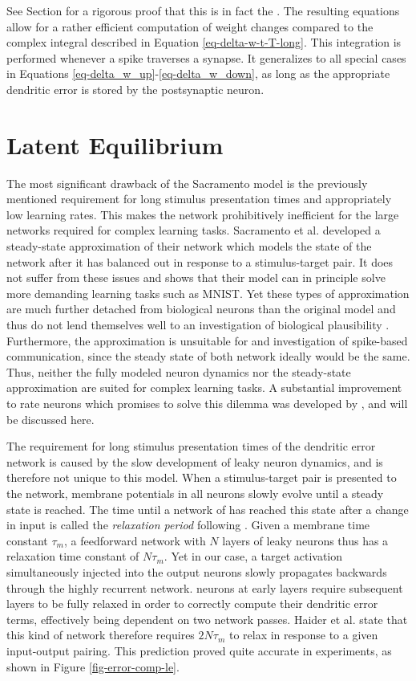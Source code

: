 See Section  for a rigorous proof that this is in fact the . The resulting equations allow for a rather
efficient computation of weight changes compared to the complex integral described in Equation
\ref{eq-delta-w-t-T-long}. This integration is performed whenever a spike traverses a synapse. It generalizes to all
special cases in Equations \ref{eq-delta_w_up}-\ref{eq-delta_w_down}, as long as the appropriate dendritic error is
stored by the postsynaptic neuron.

\section{Latent Equilibrium}\label{sec-latent-eq}

The most significant drawback of the Sacramento model is the previously mentioned requirement for long stimulus
presentation times and appropriately low learning rates. This makes the network prohibitively inefficient for the large
networks required for complex learning tasks. Sacramento et al. developed a steady-state approximation of their network
which models the state of the network after it has balanced out in response to a stimulus-target pair. It does not
suffer from these issues and shows that their model can in principle solve more demanding learning tasks such as MNIST.
Yet these types of approximation are much further detached from biological neurons than the original model and thus do
not lend themselves well to an investigation of biological plausibility \citep{Gerstner2009}. Furthermore, the
approximation is unsuitable for and investigation of spike-based communication, since the steady state of both network
ideally would be the same. Thus, neither the fully modeled neuron dynamics nor the steady-state approximation are suited
for complex learning tasks. A substantial improvement to rate neurons which promises to solve this dilemma was developed
by \cite{Haider2021}, and will be discussed here.
\newline

The requirement for long stimulus presentation times of the dendritic error network is caused by the slow development of
leaky neuron dynamics, and is therefore not unique to this model. When a stimulus-target pair is presented to the
network, membrane potentials in all neurons slowly evolve until a steady state is reached. The time until a network of
has reached this state after a change in input is called the \textit{relaxation period} following \cite{Haider2021}.
Given a membrane time constant $\tau_m$, a feedforward network with $N$ layers of leaky neurons thus has a relaxation
time constant of $N \tau_m$. Yet in our case, a target activation simultaneously injected into the output neurons slowly
propagates backwards through the highly recurrent network. neurons at early layers require subsequent layers to be fully
relaxed in order to correctly compute their dendritic error terms, effectively being dependent on two network passes.
Haider et al. state that this kind of network therefore requires $2N\tau_m$ to relax in response to a given input-output
pairing. This prediction proved quite accurate in experiments, as shown in Figure \ref{fig-error-comp-le}.

